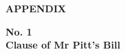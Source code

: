 

















\clearpage
\begin{center}
  \textbf{\large APPENDIX} \par 
\end{center}

\PRLsep
\begin{center}
  \textbf{\large No. 1 \\Clause of Mr Pitt's Bill} \par 
\end{center}

